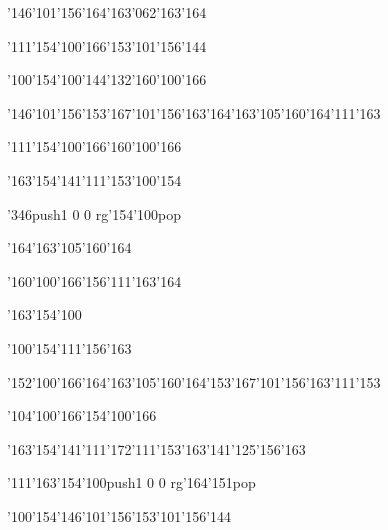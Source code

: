 \null\vfill\ipa\centerline{\enskip\enskip\enskip\enskip\char'146\char'101\char'156\enskip\char'164\char'163\char'062\char'163\char'164}\medskip\centerline{\enskip\char'111\enskip\char'154\char'100\char'166\enskip\char'153\char'101\char'156\char'144\enskip\enskip\enskip}\medskip\centerline{\enskip\enskip\enskip\enskip\enskip\enskip\enskip\enskip\enskip\enskip\enskip\enskip}\medskip\centerline{\enskip\char'100\char'154\enskip\char'100\char'144\char'132\enskip\enskip\enskip\enskip\char'160\char'100\char'166}\medskip\centerline{\enskip\char'146\char'101\char'156\enskip\char'153\char'167\char'101\char'156\char'163\enskip\char'164\char'163\char'105\char'160\char'164\enskip\char'111\char'163}\medskip\centerline{\enskip\char'111\enskip\char'154\char'100\char'166\enskip\char'160\char'100\char'166\enskip\enskip\enskip\enskip\enskip\enskip\enskip}\medskip\centerline{\enskip\char'163\char'154\char'141\char'111\char'153\enskip\enskip\enskip\enskip\enskip\enskip\enskip\enskip\enskip\enskip\char'100\char'154}\medskip\centerline{\enskip\char'346\enskip\enskip\enskip\enskip\enskip\pdfcolorstack\match push{1 0 0 rg}\char'154\char'100\pdfcolorstack\match pop{}\enskip\enskip\enskip}\medskip\centerline{\enskip\enskip\enskip\enskip\enskip\enskip\enskip\enskip\enskip\enskip\enskip\enskip\enskip\enskip\enskip}\medskip\vfill\footline{\hfil\tt\folio\hfil}\eject
\null\vfill\ipa\centerline{\enskip\enskip\enskip\enskip\enskip\enskip\enskip\enskip\char'164\char'163\char'105\char'160\char'164}\medskip\centerline{\enskip\enskip\enskip\char'160\char'100\char'166\enskip\char'156\char'111\char'163\char'164\enskip\enskip\enskip}\medskip\centerline{\enskip\enskip\enskip\char'163\char'154\char'100\enskip\enskip\enskip\enskip\enskip\enskip}\medskip\centerline{\enskip\char'100\char'154\enskip\char'111\char'156\char'163\enskip\enskip\enskip\enskip\enskip\enskip\enskip}\medskip\centerline{\enskip\char'152\char'100\char'166\enskip\char'164\char'163\char'105\char'160\char'164\enskip\char'153\char'167\char'101\char'156\char'163\enskip\char'111\char'153}\medskip\centerline{\enskip\enskip\enskip\char'104\char'100\char'166\enskip\char'154\char'100\char'166\enskip\enskip\enskip\enskip\enskip\enskip\enskip}\medskip\centerline{\enskip\char'163\char'154\char'141\char'111\char'172\enskip\char'111\char'153\enskip\char'163\char'141\char'125\char'156\char'163\enskip\enskip\enskip}\medskip\centerline{\enskip\char'111\enskip\char'163\char'154\char'100\enskip\enskip\enskip\enskip\pdfcolorstack\match push{1 0 0 rg}\char'164\char'151\pdfcolorstack\match pop{}}\medskip\centerline{\enskip\char'100\char'154\enskip\enskip\enskip\enskip\char'146\char'101\char'156\enskip\char'153\char'101\char'156\char'144}\medskip\vfill\footline{\hfil\tt\folio\hfil}\eject
